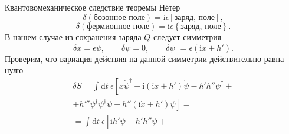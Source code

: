 \documentclass[a4paper, 14pt]{extarticle}
\begin{document}
\begin{sol}
Квантовомеханическое следствие теоремы Нётер
\[
	\delta \left( \text{бозонное поле} \right) =
	\mathrm{i} \epsilon \left[\text{заряд},\,\text{поле}  \right] 
,\] 
\[
	\delta \left( \text{фермионное поле} \right) =
	\mathrm{i} \epsilon \left\{\text{заряд},\,\text{поле}  \right\} 
.\] 
В нашем случае из сохранения заряда $Q$ следует симметрия
\[
\delta x=\epsilon \psi,\qquad \delta \psi=0,\qquad
\delta \psi^\dagger=\epsilon \left(\mathrm{i} \dot{x}+h'\right)
.\] 
Проверим, что вариация действия на данной симметрии
действительно равна нулю
\begin{multline*}
\delta S=\int \mathrm{d}  t \ \epsilon  \left[ 
\dot{x} \dot{\psi}^\dagger+ \mathrm{i} 
 \left( \mathrm{i} \dot{x}+h' \right)\dot{\psi} -h'h''\psi^\dagger\right. + \\ + \left.h'''\psi^\dagger \psi^\dagger \psi +h''
\left( \mathrm{i} \dot{x}+h' \right)\psi \right] =
\\=\int \mathrm{d} t\ \epsilon  \left[ \mathrm{i} h'\dot{\psi}  -h'h''\psi+

\end{multline*}
\end{sol}
\end{document}
